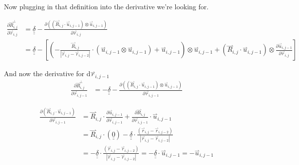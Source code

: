 \documentclass{article}
\renewcommand{\ij}{_{i,j}}
\newcommand{\ijj}{_{i,j-1}}
\newcommand{\ijjj}{_{i,j-2}}
\newcommand{\magn}[1]{\left\vert #1 \right\vert }
\renewcommand{\part}[2]{\frac{\partial #1 }{\partial #2}}
\newcommand{\harp}{\overset{\rightharpoonup}}
\newcommand{\ten}[1]{\underline{\underline{#1}}}
\newcommand{\rij}{\harp r \ij}
\newcommand{\Rij}{\harp R \ij}
\newcommand{\rijj}{\harp r \ijj}
\newcommand{\rijjj}{\harp r \ijjj}
\newcommand{\uijj}{\harp u \ijj}
\begin{document}
Now plugging in that definition into the derivative we're looking for.

\begin{align*}
  \part{\harp R\ij ^ \bot}{\harp r\ij}  &=  \ten{\delta} 
  - \part{\left(\left(\harp R\ij \cdot \harp u \ijj \right) \otimes 
  \harp u \ijj \right)
  }{\harp r\ij} \\
  &= 
  \ten{\delta} 
  -
  \left[
  \left(
  -\frac{\harp R \ij}{\magn{\rij - \rijjj}} \cdot (\uijj \otimes \uijj ) 
  +  \uijj
  \right) \otimes \uijj
  +  
  \left(\harp R\ij \cdot \harp u \ijj \right)
  \otimes 
  {\part{\harp u \ijj }{\harp r\ij} }
  \right]
\end{align*}
 


And now the derivative for d$\rijj$
\begin{align*}
  \part{\harp R\ij ^ \bot}{\harp r\ijj}  &= - \ten{\delta} 
  - \part{\left(\left(\harp R\ij \cdot \harp u \ijj \right) \otimes 
  \harp u \ijj \right)
  }{\harp r\ijj}
\end{align*}


\begin{align*}
  \part{\left(\harp R\ij \cdot \harp u \ijj \right)}{\harp r\ijj}   
  &= 
  \harp R\ij \cdot \part{\harp u \ijj}{\harp r \ijj} + \part{\harp R \ij}{\harp r \ijj} \cdot \harp u\ijj
  \\
  &= 
  \Rij \cdot \left( \ten{0}
  \right) 
  - \ten{\delta} \cdot \frac{\left( \rij - \rijjj \right)}{\magn{\rij - \rijjj}} 
  \\ 
  &= 
  - \ten{\delta} \cdot \frac{\left( \rij - \rijjj \right)}{\magn{\rij - \rijjj}} 
  =
  - \ten{\delta} \cdot \uijj
  =
  - \uijj
\end{align*}
\end{document}
